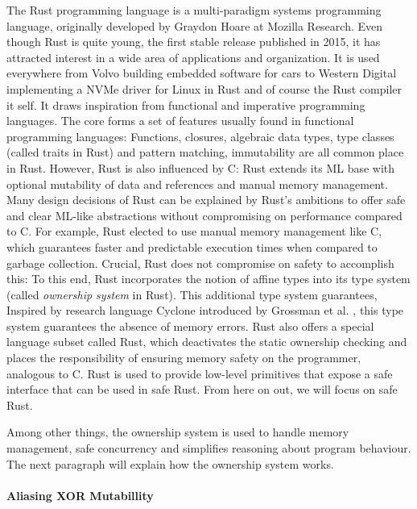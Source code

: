 \documentclass[twoside, english]{sdqthesis}
\theoremstyle{definition}
\begin{document}
The Rust programming language \cite{matsakis_rust_2014} is a multi-paradigm systems programming language, originally developed by Graydon Hoare at Mozilla Research.
Even though Rust is quite young, the first stable release published in 2015, it has attracted interest in a wide area of applications and organization. It is used everywhere from Volvo building embedded software for cars \cite{foufas_why_2022} to Western Digital implementing a NVMe driver for Linux in Rust \cite{larabel_lpc_2022} and of course the Rust compiler it self.
It draws inspiration from functional and imperative programming languages. The core forms a set of features usually found in functional programming languages: Functions, closures, algebraic data types, type classes (called traits in Rust) and pattern matching, immutability are all common place in Rust.
However, Rust is also influenced by C: Rust extends its ML base with optional mutability of data and references and manual memory management. Many design decisions of Rust can be explained by Rust's ambitions to offer safe and clear ML-like abstractions without compromising on performance compared to C.
For example, Rust elected to use manual memory management like C, which guarantees faster and predictable execution times when compared to garbage collection. Crucial, Rust does not compromise on safety to accomplish this: To this end, Rust incorporates the notion of affine types into its type system (called \textit{ownership system} in Rust). This additional type system guarantees, 
Inspired by research language Cyclone introduced by Grossman et al. \cite{grossman_region-based_nodate}, this type system guarantees the absence of memory errors.
Rust also offers a special language subset called  Rust, which deactivates the static ownership checking and places the responsibility of ensuring memory safety on the programmer, analogous to C.  Rust is used to provide low-level primitives that expose a safe interface that can be used in safe Rust. From here on out, we will focus on safe Rust.

Among other things, the ownership system is used to handle memory management, safe concurrency and simplifies reasoning about program behaviour.
The next paragraph will explain how the ownership system works.

\paragraph{Aliasing XOR Mutabillity}
\end{document}
